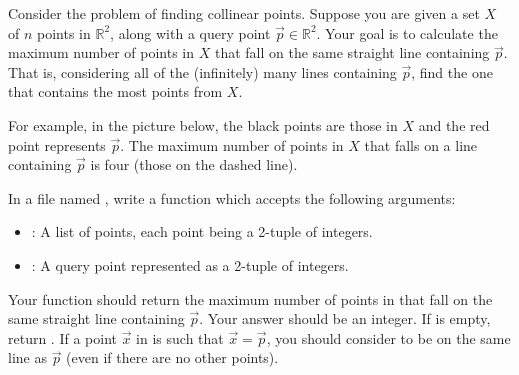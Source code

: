 \begin{progprob}

    Consider the problem of finding collinear points.
    Suppose you are given a set $X$ of $n$ points in $\mathbb R^2$, along with a query 
    point $\vec p \in \mathbb R^2$. Your goal is to calculate the maximum
    number of points in $X$ that fall on the same straight line containing $\vec{p}$.
    That is, considering all of the (infinitely) many lines containing $\vec p$,
    find the one that contains the most points from $X$.

    For example, in the picture below, the black points are those in $X$ and the red
    point represents $\vec p$. The maximum number of points in $X$ that falls on a line
    containing $\vec p$ is four (those on the dashed line).

    \begin{center}
    \end{center}

    In a file named , write a function
     which accepts the following arguments:
    \begin{itemize}
        \item {}: A list of points, each point being a 2-tuple of integers.
        \item {}: A query point represented as a 2-tuple of integers.
    \end{itemize}
    Your function should return the maximum number of points in  that fall
    on the same straight line containing $\vec p$. Your answer should be an
    integer. If  is empty, return . If a point $\vec{x}$ in 
    is such that $\vec x = \vec p$, you should consider to be on the same line as $\vec{p}$
    (even if there are no other points).


\end{progprob}
